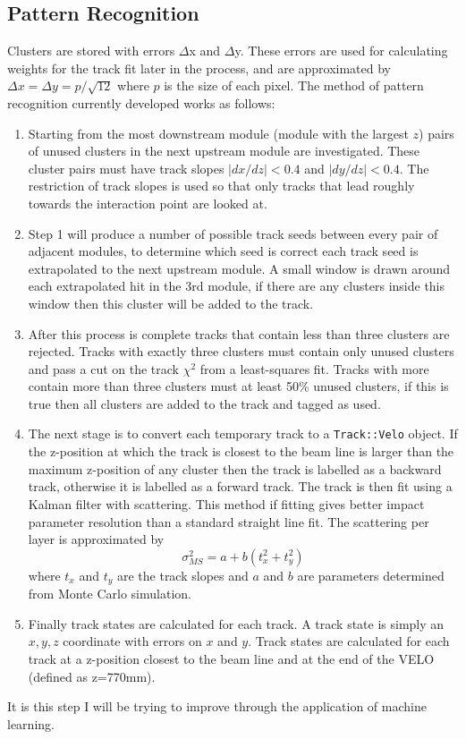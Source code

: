 \subsection{Pattern Recognition}
Clusters are stored with errors $\Delta$x and $\Delta$y. These errors are used for calculating weights for the track fit later in the process, and are approximated by $\Delta x = \Delta y = p/\sqrt{12}$ where $p$ is the size of each pixel.
The method of pattern recognition currently developed works as follows:
\begin{enumerate}
    \item Starting from the most downstream module (module with the largest $z$) pairs of unused clusters in the next upstream module are investigated. These cluster pairs must have track slopes $|dx/dz|<0.4$ and $|dy/dz|<0.4$. The restriction of track slopes is used so that only tracks that lead roughly towards the interaction point are looked at.
    \item Step 1 will produce a number of possible track seeds between every pair of adjacent modules, to determine which seed is correct each track seed is extrapolated to the next upstream module. A small window is drawn around each extrapolated hit in the 3rd module, if there are any clusters inside this window then this cluster will be added to the track.
    \item After this process is complete tracks that contain less than three clusters are rejected. Tracks with exactly three clusters must contain only unused clusters and pass a cut on the track $\chi^2$ from a least-squares fit. Tracks with more contain more than three clusters must at least 50\% unused clusters, if this is true then all clusters are added to the track and tagged as used.
    \item The next stage is to convert each temporary track to a \verb|Track::Velo| object. If the z-position at which the track is closest to the beam line is larger than the maximum z-position of any cluster then the track is labelled as a backward track, otherwise it is labelled as a forward track. The track is then fit using a Kalman filter with scattering. This method if fitting gives better impact parameter resolution than a standard straight line fit. The scattering per layer is approximated by
    $$\sigma_{MS}^{2}=a+b(t_{x}^{2}+t_{y}^{2})$$
    where $t_x$ and $t_y$ are the track slopes and $a$ and $b$ are parameters determined from Monte Carlo simulation.
    \item Finally track states are calculated for each track. A track state is simply an $x,y,z$ coordinate with errors on $x$ and $y$. Track states are calculated for each track at a z-position closest to the beam line and at the end of the VELO (defined as z=770mm).
\end{enumerate}
It is this step I will be trying to improve through the application of machine learning.


